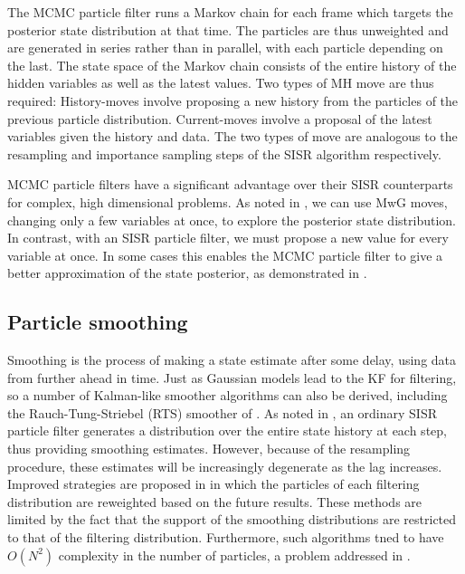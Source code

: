 The MCMC particle filter runs a Markov chain for each frame which targets the posterior state distribution at that time. The particles are thus unweighted and are generated in series rather than in parallel, with each particle depending on the last. The state space of the Markov chain consists of the entire history of the hidden variables as well as the latest values. Two types of MH move are thus required: History-moves involve proposing a new history from the particles of the previous particle distribution. Current-moves involve a proposal of the latest variables given the history and data. The two types of move are analogous to the resampling and importance sampling steps of the SISR algorithm respectively.

MCMC particle filters have a significant advantage over their SISR counterparts for complex, high dimensional problems. As noted in \cite{Pang2008}, we can use MwG moves, changing only a few variables at once, to explore the posterior state distribution. In contrast, with an SISR particle filter, we must propose a new value for every variable at once. In some cases this enables the MCMC particle filter to give a better approximation of the state posterior, as demonstrated in \cite{Pang2011}.



\subsection{Particle smoothing}
Smoothing is the process of making a state estimate after some delay, using data from further ahead in time. Just as Gaussian models lead to the KF for filtering, so a number of Kalman-like smoother algorithms can also be derived, including the Rauch-Tung-Striebel (RTS) smoother of \cite{Rauch1965}. As noted in \cite{Kitagawa1996}, an ordinary SISR particle filter generates a distribution over the entire state history at each step, thus providing smoothing estimates. However, because of the resampling procedure, these estimates will be increasingly degenerate as the lag increases. Improved strategies are proposed in \cite{Clapp1999,Doucet2000a,Godsill2004} in which the particles of each filtering distribution are reweighted based on the future results. These methods are limited by the fact that the support of the smoothing distributions are restricted to that of the filtering distribution. Furthermore, such algorithms tned to have $O(N^2)$ complexity in the number of particles, a problem addressed in \cite{Klaas2006}.

